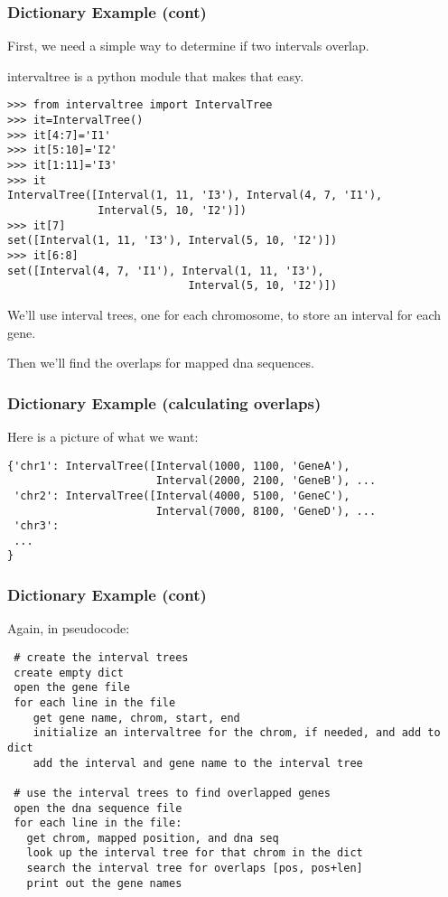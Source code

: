 \documentclass[10pt]{beamer}
\newcommand\smallfont{\fontsize{8pt}{7.2}\selectfont}
\begin{document}
\begin{frame}[fragile]
\frametitle{Dictionary Example (cont)}

First, we need a simple way to determine if two intervals overlap.  
\vspace{2mm}

intervaltree is a python module that makes that easy.

\smallfont
\begin{verbatim}
>>> from intervaltree import IntervalTree
>>> it=IntervalTree()
>>> it[4:7]='I1'
>>> it[5:10]='I2'
>>> it[1:11]='I3'
>>> it
IntervalTree([Interval(1, 11, 'I3'), Interval(4, 7, 'I1'), 
              Interval(5, 10, 'I2')])
>>> it[7]
set([Interval(1, 11, 'I3'), Interval(5, 10, 'I2')])
>>> it[6:8]
set([Interval(4, 7, 'I1'), Interval(1, 11, 'I3'), 
                            Interval(5, 10, 'I2')]) 
\end{verbatim}

We'll use interval trees, one for each chromosome, to store an interval for each gene.
\vspace{2mm}

Then we'll find the overlaps for mapped dna sequences.

\end{frame}

\begin{frame}[fragile]
\frametitle{Dictionary Example (calculating overlaps)}

Here is a picture of what we want:

\smallfont
\begin{verbatim}
{'chr1': IntervalTree([Interval(1000, 1100, 'GeneA'), 
                       Interval(2000, 2100, 'GeneB'), ...
 'chr2': IntervalTree([Interval(4000, 5100, 'GeneC'), 
                       Interval(7000, 8100, 'GeneD'), ...
 'chr3':
 ...
}
\end{verbatim}

\end{frame}


\begin{frame}[fragile]
\frametitle{Dictionary Example (cont)}
\smallfont
Again, in pseudocode:
\begin{verbatim}
 # create the interval trees
 create empty dict
 open the gene file
 for each line in the file
    get gene name, chrom, start, end
    initialize an intervaltree for the chrom, if needed, and add to dict
    add the interval and gene name to the interval tree

 # use the interval trees to find overlapped genes
 open the dna sequence file
 for each line in the file:
   get chrom, mapped position, and dna seq
   look up the interval tree for that chrom in the dict
   search the interval tree for overlaps [pos, pos+len]
   print out the gene names

\end{verbatim}
\end{frame}
\end{document}
